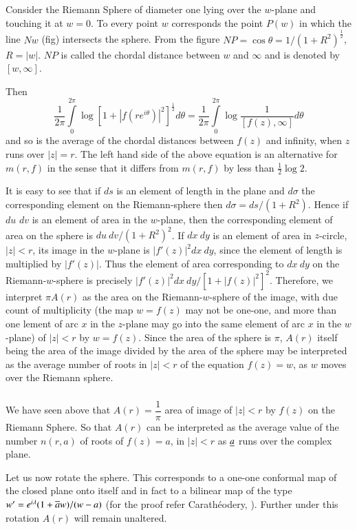 Consider the Riemann Sphere of diameter one lying over the $w$-plane
and touching it at $w=0$. To every point $w$ corresponds the point
$P(w)$ in which the line $Nw$ (fig) intersects the sphere. From the
figure $NP=\cos\theta=1/(1+R^{2})^{\frac{1}{2}}$, $R=|w|$. $NP$ is
called the chordal distance between $w$ and $\infty$ and is denoted by
$[w,\infty]$. 

Then\pageoriginale
$$
\frac{1}{2\pi}\int\limits^{2\pi}_{0}\log[1+|f(re^{i\theta})|^{2}]^{\frac{1}{2}}d\theta=\frac{1}{2\pi}\int\limits^{2\pi}_{0}\log\frac{1}{[f(z),\infty]}d\theta
$$
and so is the average of the chordal distances between $f(z)$ and
infinity, when $z$ runs over $|z|=r$. The left hand side of the above
equation is an alternative for $m(r,f)$ in the sense that it differs
from $m(r,f)$ by less than $\frac{1}{2}\log 2$.

It is easy to see that if $ds$ is an element of length in the plane
and $d\sigma$ the corresponding element on the Riemann-sphere then
$d\sigma=ds/(1+R^{2})$. Hence if $du$ $dv$ is an element of area in
the $w$-plane, then the corresponding element of area on the sphere is
$du\ dv/(1+R^{2})^{2}$. If $dx\ dy$ is an element of area in
$z$-circle, $|z|<r$, its image in the $w$-plane is
$|f'(z)|^{2}dx\ dy$, since the element of length is multiplied by
$|f'(z)|$. Thus the element of area corresponding to $dx\ dy$ on the
Riemann-$w$-sphere is precisely
$|f'(z)|^{2}dx\ dy/[1+|f(z)|^{2}]^{2}$. Therefore, we interpret $\pi
A(r)$ as the area on the Riemann-$w$-sphere of the image, with due
count of multiplicity (the map $w=f(z)$ may not be one-one, and more
than one lement of arc $x$ in the $z$-plane may go into the same
element of arc $x$ in the $w$-plane) of $|z|<r$ by $w=f(z)$. Since the
area of the sphere is $\pi$, $A(r)$ itself being the area of the image
divided by the area of the sphere may be interpreted as the average
number of roots in $|z|<r$ of the equation $f(z)=w$, as $w$ moves over
the Riemann sphere.

\subsubsection{}\label{part1-subsubsec1.6.2}\pageoriginale

We have seen above that $A(r)=\dfrac{1}{\pi}$ area of image of $|z|<r$
by $f(z)$ on the Riemann Sphere. So that $A(r)$ can be interpreted as
the average value of the number $n(r,a)$ of roots of $f(z)=a$, in
$|z|<r$ as $\underline{a}$ runs over the complex plane.

Let us now rotate the sphere. This corresponds to a one-one conformal
map of the closed plane onto itself and in fact to a bilinear map of
the type $w'=e^{i\lambda}(1+\overline{a}w)/(w-a)$ (for the proof refer
Carath\'eodery, \cite{1}). Further under this rotation $A(r)$ will
remain unaltered.

